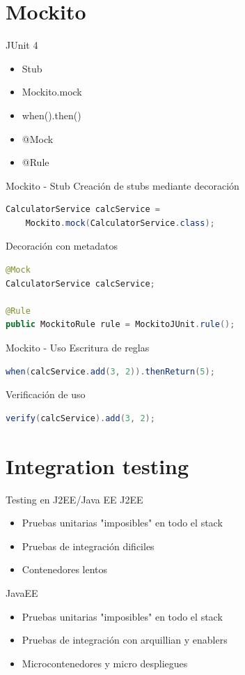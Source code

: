 \documentclass{beamer}
\begin{document}
\section{Mockito}

\begin{frame}{JUnit 4}
\begin{itemize}
	\item Stub
	\item Mockito.mock
	\item when().then()
	\item @Mock
	\item @Rule
\end{itemize}
\end{frame}

\begin{frame}[containsverbatim]{Mockito - Stub}
Creación de stubs mediante decoración

\begin{lstlisting}[language=Java]
CalculatorService calcService =
	Mockito.mock(CalculatorService.class);
\end{lstlisting}
Decoración con metadatos
\begin{lstlisting}[language=Java]
@Mock
CalculatorService calcService;

@Rule
public MockitoRule rule = MockitoJUnit.rule();
\end{lstlisting}
\end{frame}


\begin{frame}[containsverbatim]{Mockito - Uso}
Escritura de reglas
\begin{lstlisting}[language=Java]
when(calcService.add(3, 2)).thenReturn(5);
\end{lstlisting}
Verificación de uso
\begin{lstlisting}[language=Java]
verify(calcService).add(3, 2);
\end{lstlisting}
\end{frame}

\section{Integration testing}

\begin{frame}{Testing en J2EE/Java EE}
J2EE
\begin{itemize}
	\item Pruebas unitarias "imposibles" en todo el stack
	\item Pruebas de integración dificiles
	\item Contenedores lentos
\end{itemize}
JavaEE
\begin{itemize}
	\item Pruebas unitarias "imposibles" en todo el stack
	\item Pruebas de integración con arquillian y enablers
	\item Microcontenedores y micro despliegues
\end{itemize}
\end{frame}
\end{document}
